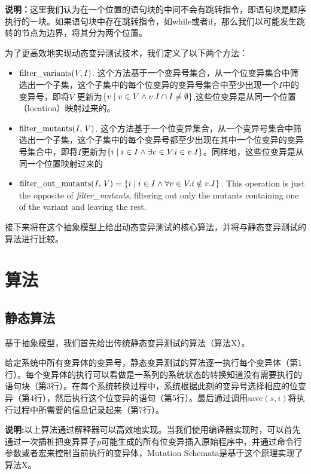 \documentclass[nofonts]{ctexrep}
\begin{document}
\textbf{说明：}这里我们认为在一个位置的语句块的中间不会有跳转指令，即语句块是顺序执行的一块。如果语句块中存在跳转指令，如while或者if，那么我们以可能发生跳转的节点为边界，将其分为两个位置。

为了更高效地实现动态变异测试技术，我们定义了以下两个方法：
\begin{itemize}
\item $\mathrm{filter\_variants}(V, I)$. 这个方法基于一个变异号集合，从一个位变异集合中筛选出一个子集，这个子集中的每个位变异的变异号集合中至少出现一个$I$中的变异号，即将$V$ 更新为$\left\{v\mid v\in V \wedge v.I
  \cap I \neq \emptyset \right\}$.这些位变异是从同一个位置（location）映射过来的。
  
\item
  $\mathit{\mathrm{filter\_mutants}(I, V)}$.
这个方法基于一个位变异集合，从一个变异号集合中筛选出一个子集，这个子集中的每个变异号都至少出现在其中一个位变异的变异号集合中，即将$I$更新为$\left\{i\mid i\in I \wedge \exists v
    \in V. i \in v.I \right\}$。同样地，这些位变异是从同一个位置映射过来的
\item
  $\mathit{\mathrm{filter\_out\_mutants}(I, V)}=\left\{i\mid i\in I \wedge
     \forall v \in V. i \notin v.I \right\}$.
  This operation is just the opposite of {\it filter\_mutants},
  filtering out only the mutants containing one of the variant and
  leaving the rest.
  
\end{itemize}
接下来将在这个抽象模型上给出动态变异测试的核心算法，并将与静态变异测试的算法进行比较。
\section{算法}
\subsection{静态算法}
基于抽象模型，我们首先给出传统静态变异测试的算法（算法X）。

给定系统中所有变异体的变异号，静态变异测试的算法逐一执行每个变异体（第1行）。每个变异体的执行可以看做是一系列的系统状态的转换知道没有需要执行的语句块（第3行）。在每个系统转换过程中，系统根据此刻的变异号选择相应的位变异（第4行），然后执行这个位变异的语句（第5行）。最后通过调用save$(s,i)$将执行过程中所需要的信息记录起来（第7行）。

\textbf{说明:}以上算法通过解释器可以高效地实现。当我们使用编译器实现时，可以首先通过一次插桩把变异算子$p$可能生成的所有位变异插入原始程序中，并通过命令行参数或者宏来控制当前执行的变异体，Mutation Schemata是基于这个原理实现了算法X。
\end{document}
